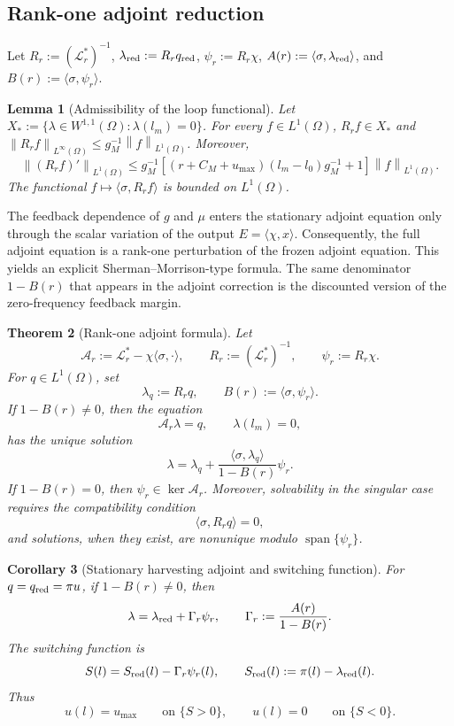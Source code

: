 \documentclass[pdflatex,sn-mathphys-num]{sn-jnl}
\theoremstyle{thmstyleone}
\newtheorem{theorem}{Theorem}[section]
\newtheorem{lemma}[theorem]{Lemma}
\newtheorem{corollary}[theorem]{Corollary}
\theoremstyle{definition}
\theoremstyle{remark}
\newcommand{\Om}{\Omega}
\newcommand{\Lcal}{\mathcal{L}}
\newcommand{\norm}[1]{\left\lVert#1\right\rVert}
\numberwithin{equation}{section}
\begin{document}
\subsection{Rank-one adjoint reduction}
\label{subsec:main-adjoint}
Let
$R_r:=(\Lcal_r^*)^{-1}$,
$\lambda_{\rm red}:=R_rq_{\rm red}$,
$\psi_r:=R_r\chi$,
$A(r):=\langle\sigma,\lambda_{\rm red}\rangle$,
and
$B(r):=\langle\sigma,\psi_r\rangle$.
\begin{lemma}[Admissibility of the loop functional]
\label{lem:main-loop-admissibility}
Let
$\displaystyle 
X_*:=
\{\lambda\in W^{1,1}(\Om):\lambda(l_m)=0\}$.
For every \(f\in L^1(\Om)\),
$R_rf\in X_*$
and
$\displaystyle 
\norm{R_rf}_{L^\infty(\Om)}
\le
g_M^{-1}\norm{f}_{L^1(\Om)}$.
Moreover,
\[
\norm{(R_rf)'}_{L^1(\Om)}
\le
g_M^{-1}
\left[
(r+C_M+u_{\max})(l_m-l_0)g_M^{-1}+1
\right]
\norm{f}_{L^1(\Om)}.
\]
The functional $\displaystyle 
f\mapsto \langle\sigma,R_rf\rangle$ is bounded on \(L^1(\Om)\).
\end{lemma}

The feedback dependence of \(g\) and \(\mu\) enters the stationary adjoint equation
only through the scalar variation of the output \(E=\langle\chi,x\rangle\).
Consequently, the full adjoint equation is a rank-one perturbation of the frozen
adjoint equation. This yields an explicit Sherman--Morrison-type formula. The
same denominator \(1-B(r)\) that appears in the adjoint correction is the
discounted version of the zero-frequency feedback margin.

\begin{theorem}[Rank-one adjoint formula]
\label{thm:main-rankone}
Let
\[
\mathcal A_r:=\mathcal L_r^*-\chi\langle\sigma,\cdot\rangle,
\qquad
R_r:=(\mathcal L_r^*)^{-1},
\qquad
\psi_r:=R_r\chi .
\]
For \(q\in L^1(\Omega)\), set
\[
\lambda_q:=R_rq,
\qquad
B(r):=\langle\sigma,\psi_r\rangle .
\]
If $1-B(r)\ne0$,
then the equation
\[
\mathcal A_r\lambda=q,
\qquad
\lambda(l_m)=0,
\]
has the unique solution
\[
\lambda
=
\lambda_q
+
\frac{\langle\sigma,\lambda_q\rangle}
     {1-B(r)}
\psi_r .
\]
If \(1-B(r)=0\), then
$\psi_r\in\ker \mathcal A_r$.
Moreover, solvability in the singular case requires the compatibility condition
\[
\langle\sigma,R_rq\rangle=0,
\]
and solutions, when they exist, are nonunique modulo
\(\operatorname{span}\{\psi_r\}\).
\end{theorem}

\begin{corollary}[Stationary harvesting adjoint and switching function]
\label{cor:main-switching-formula}
For \(q=q_{\rm red}=\pi u\), if \(1-B(r)\ne0\), then
\[
\lambda
=
\lambda_{\rm red}
+
\Gamma_r\psi_r,
\qquad
\Gamma_r:=
\frac{A(r)}{1-B(r)}.
\]
The switching function is
\[
S(l)
=
S_{\rm red}(l)-\Gamma_r\psi_r(l),
\qquad
S_{\rm red}(l):=\pi(l)-\lambda_{\rm red}(l).
\]
Thus
\[
u(l)=u_{\max}\qquad\text{on }\{S>0\},
\qquad
u(l)=0\qquad\text{on }\{S<0\}.
\]
\end{corollary}
\end{document}
